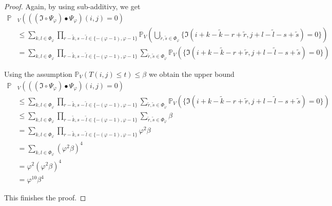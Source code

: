 \documentclass[a4paper,12pt]{article}
\theoremstyle{plain}
\theoremstyle{definition}
\begin{document}
\begin{appendix}
\begin{proof}
		Again, by using sub-additivy, we get
		\begin{align*}
			\mathbb{P}&_V( ((\mathfrak{I} \circ \Psi_\varphi) \bullet \Psi_\varphi)(i, j) = 0 ) \\
			&\leq \sum_{k, l \in \Phi_\varphi} \prod_{r - \tilde{k}, s - \tilde{l} \in \{ - ( \varphi - 1 ), \varphi - 1 \}} \mathbb{P}_V\left( \bigcup_{\tilde{r}, \tilde{s} \in \Phi_\varphi} \{ \mathfrak{I}(i + k - \tilde{k} - r + \tilde{r}, j + l - \tilde{l} - s + \tilde{s}) = 0 \} \right) \\
			&= \sum_{k, l \in \Phi_\varphi} \prod_{r - \tilde{k}, s - \tilde{l} \in \{ - ( \varphi - 1 ), \varphi - 1 \}} \sum_{\tilde{r}, \tilde{s} \in \Phi_\varphi} \mathbb{P}_V\left( \{ \mathfrak{I}(i + k - \tilde{k} - r + \tilde{r}, j + l - \tilde{l} - s + \tilde{s}) = 0 \} \right)
		\end{align*}
		
		Using the assumption $\mathbb{P}_V\left( T(i, j) \leq t \right) \leq \beta$ we obtain the upper bound
		\begin{align*}
			\mathbb{P}&_V( ((\mathfrak{I} \circ \Psi_\varphi) \bullet \Psi_\varphi)(i, j) = 0 ) \\
			&\leq \sum_{k, l \in \Phi_\varphi} \prod_{r - \tilde{k}, s - \tilde{l} \in \{ - ( \varphi - 1 ), \varphi - 1 \}} \sum_{\tilde{r}, \tilde{s} \in \Phi_\varphi} \mathbb{P}_V\left( \{ \mathfrak{I}(i + k - \tilde{k} - r + \tilde{r}, j + l - \tilde{l} - s + \tilde{s}) = 0 \} \right) \\
			&\leq \sum_{k, l \in \Phi_\varphi} \prod_{r - \tilde{k}, s - \tilde{l} \in \{ - ( \varphi - 1 ), \varphi - 1 \}} \sum_{\tilde{r}, \tilde{s} \in \Phi_\varphi} \beta \\
			&= \sum_{k, l \in \Phi_\varphi} \prod_{r - \tilde{k}, s - \tilde{l} \in \{ - ( \varphi - 1 ), \varphi - 1 \}} \varphi^2 \beta \\
			&= \sum_{k, l \in \Phi_\varphi} ( \varphi^2 \beta )^4 \\
			&= \varphi^2 ( \varphi^2 \beta )^4 \\
			&= \varphi^{10} \beta^4
		\end{align*}
		
		This finishes the proof.
	\end{proof}
	
	\newpage
	

\end{appendix}
\end{document}
